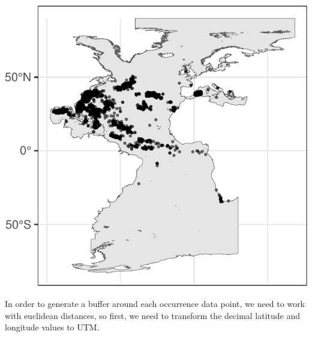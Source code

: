\documentclass[
]{book}
\newenvironment{Shaded}{\begin{snugshade}}{\end{snugshade}}
\newcommand{\CommentTok}[1]{\textcolor[rgb]{0.56,0.35,0.01}{\textit{#1}}}
\newcommand{\ControlFlowTok}[1]{\textcolor[rgb]{0.13,0.29,0.53}{\textbf{#1}}}
\newcommand{\DecValTok}[1]{\textcolor[rgb]{0.00,0.00,0.81}{#1}}
\newcommand{\FunctionTok}[1]{\textcolor[rgb]{0.00,0.00,0.00}{#1}}
\newcommand{\NormalTok}[1]{#1}
\newcommand{\OtherTok}[1]{\textcolor[rgb]{0.56,0.35,0.01}{#1}}
\newcommand{\SpecialCharTok}[1]{\textcolor[rgb]{0.00,0.00,0.00}{#1}}
\begin{document}
\includegraphics{_main_files/figure-latex/unnamed-chunk-18-1.pdf}

In order to generate a buffer around each occurrence data point, we need to work with euclidean distances, so first, we need to transform the decimal latitude and longitude values to UTM.

\begin{Shaded}
\end{Shaded}
\end{document}
